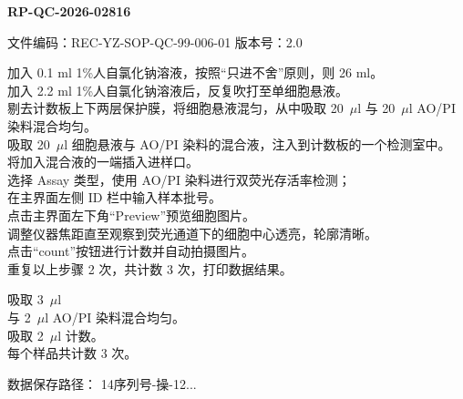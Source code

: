 \documentclass[UTF8,10pt,a4paper,fontset=fandol]{ctexart}
\newcommand{\fieldvalue}[1]{#1}
\newcommand{\handwritten}[1]{#1}
\begin{document}

\newpage

\noindent
\textbf{RP-QC-2026-02816}

\begin{flushright}
文件编码：REC-YZ-SOP-QC-99-006-01 \qquad 版本号：2.0
\end{flushright}

\begin{minipage}{0.55\linewidth}
加入 0.1 ml 1\%人自氯化钠溶液，按照“只进不舍”原则，则 26 ml。\\
加入 2.2 ml 1\%人自氯化钠溶液后，反复吹打至单细胞悬液。\\
剔去计数板上下两层保护膜，将细胞悬液混匀，从中吸取 20~$\mu$l 与 20~$\mu$l AO/PI 染料混合均匀。\\
吸取 20~$\mu$l 细胞悬液与 AO/PI 染料的混合液，注入到计数板的一个检测室中。\\
将加入混合液的一端插入进样口。\\
选择 Assay 类型，使用 AO/PI 染料进行双荧光存活率检测；\\
在主界面左侧 ID 栏中输入样本批号。\\
点击主界面左下角“Preview”预览细胞图片。\\
调整仪器焦距直至观察到荧光通道下的细胞中心透亮，轮廓清晰。\\
点击“count”按钮进行计数并自动拍摄图片。\\
重复以上步骤 2 次，共计数 3 次，打印数据结果。
\end{minipage}
\hfill
\begin{minipage}{0.40\linewidth}
吸取
\fieldvalue{\handwritten{3}}~$\mu$l\\[3pt]
与
\fieldvalue{\handwritten{2}}~$\mu$l AO/PI 染料混合均匀。\\[3pt]
吸取
\fieldvalue{\handwritten{2}}~$\mu$l 计数。\\[3pt]
每个样品共计数
\fieldvalue{\handwritten{3}} 次。
\end{minipage}

\vspace{4pt}
数据保存路径：
\fieldvalue{\handwritten{14序列号-操-12...}}
\end{document}
